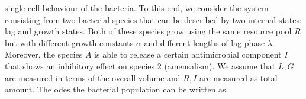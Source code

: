 \documentclass[10pt,A4paper]{article}
\numberwithin{equation}{section}
\begin{document}
single-cell behaviour of the bacteria.
To this end, we consider the system consisting from two bacterial species that can be described by two internal states: lag and growth states.
Both of these species grow using the same resource pool $R$ but with different growth constants
$\alpha$ and different lengths of lag phase $\lambda$.
Moreover, the species $A$ is able to release a certain antimicrobial component $I$ that shows an
inhibitory effect on species 2 (amensalism).
We assume that $L,G$ are measured in terms of the overall volume and $R,I$ are measured as total
amount.
The \acp{ode} the bacterial population can be written as:
%
%
%
%
%
\end{document}
